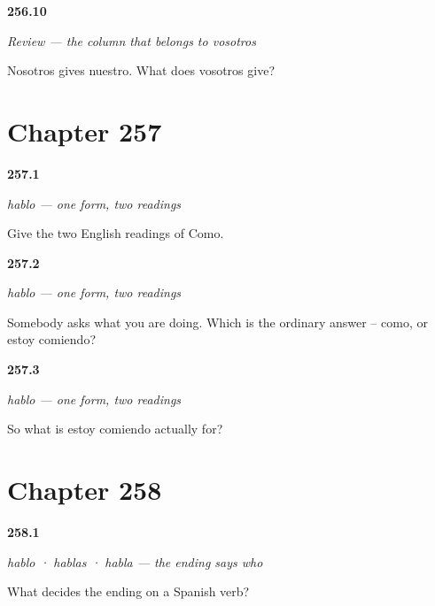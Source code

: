 \noindent\begin{minipage}[t]{\linewidth}
\raggedright
\hypertarget{review-ES-C65-repaso-columna-vosotros-posesivo}{\textbf{256.10}} \emph{Review — the column that belongs to \emph{vosotros}}\par
\small Nosotros gives nuestro. What does vosotros give?
\end{minipage}\par\medskip

\section*{Chapter 257}

\noindent\begin{minipage}[t]{\linewidth}
\raggedright
\hypertarget{review-ES-C66-hablo-dos-lecturas-both}{\textbf{257.1}} \emph{hablo — one form, two readings}\par
\small Give the two English readings of Como.
\end{minipage}\par\medskip

\noindent\begin{minipage}[t]{\linewidth}
\raggedright
\hypertarget{review-ES-C66-hablo-dos-lecturas-normal}{\textbf{257.2}} \emph{hablo — one form, two readings}\par
\small Somebody asks what you are doing. Which is the ordinary answer -- como, or estoy comiendo?
\end{minipage}\par\medskip

\noindent\begin{minipage}[t]{\linewidth}
\raggedright
\hypertarget{review-ES-C66-hablo-dos-lecturas-when}{\textbf{257.3}} \emph{hablo — one form, two readings}\par
\small So what is estoy comiendo actually for?
\end{minipage}\par\medskip

\section*{Chapter 258}

\noindent\begin{minipage}[t]{\linewidth}
\raggedright
\hypertarget{review-ES-C66-la-terminacion-dice-quien-rule}{\textbf{258.1}} \emph{hablo · hablas · habla — the ending says who}\par
\small What decides the ending on a Spanish verb?
\end{minipage}\par\medskip


